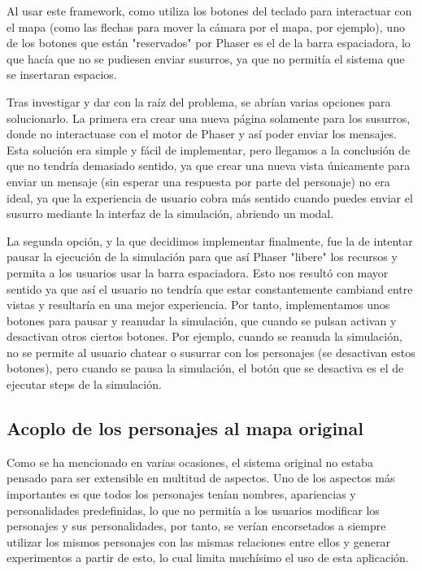 Al usar este framework, como utiliza los botones del teclado para interactuar con el mapa (como las flechas para mover la cámara por el mapa, por ejemplo), uno de los botones que están "reservados" por Phaser es el de la barra espaciadora, lo que hacía que no se pudiesen enviar susurros, ya que no permitía el sistema que se insertaran espacios.

Tras investigar y dar con la raíz del problema, se abrían varias opciones para solucionarlo. La primera era crear una nueva página solamente para los susurros, donde no interactuase con el motor de Phaser y así poder enviar los mensajes. Esta solución era simple y fácil de implementar, pero llegamos a la conclusión de que no tendría demasiado sentido, ya que crear una nueva vista únicamente para enviar un mensaje (sin esperar una respuesta por parte del personaje) no era ideal, ya que la experiencia de usuario cobra más sentido cuando puedes enviar el susurro mediante la interfaz de la simulación, abriendo un modal.

La segunda opción, y la que decidimos implementar finalmente, fue la de intentar pausar la ejecución de la simulación para que así Phaser "libere" los recursos y permita a los usuarios usar la barra espaciadora. Esto nos resultó con mayor sentido ya que así el usuario no tendría que estar constantemente cambiand entre vistas y resultaría en una mejor experiencia. Por tanto, implementamos unos botones para pausar y reanudar la simulación, que cuando se pulsan activan y desactivan otros ciertos botones. Por ejemplo, cuando se reanuda la simulación, no se permite al usuario chatear o susurrar con los personajes (se desactivan estos botones), pero cuando se pausa la simulación, el botón que se desactiva es el de ejecutar steps de la simulación.

\subsection{Acoplo de los personajes al mapa original}
\label{problemaPersonajes}
Como se ha mencionado en varias ocasiones, el sistema original no estaba pensado para ser extensible en multitud de aspectos. Uno de los aspectos más importantes es que todos los personajes tenían nombres, apariencias y personalidades predefinidas, lo que no permitía a los usuarios modificar los personajes y sus personalidades, por tanto, se verían encorsetados a siempre utilizar los mismos personajes con las mismas relaciones entre ellos y generar experimentos a partir de esto, lo cual limita muchísimo el uso de esta aplicación.

